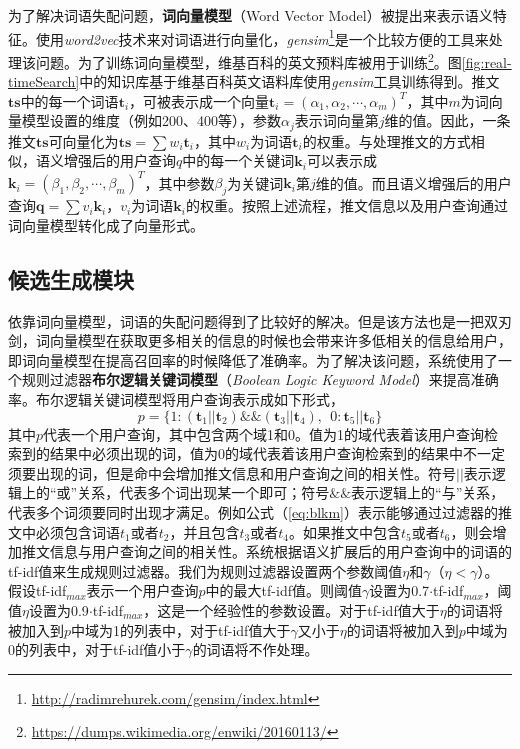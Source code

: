 为了解决词语失配问题，\textbf{词向量模型}（Word Vector Model）被提出来表示语义特征。使用\textit{word2vec}技术来对词语进行向量化，\textit{gensim}\footnote{\url{http://radimrehurek.com/gensim/index.html}}是一个比较方便的工具来处理该问题。为了训练词向量模型，维基百科的英文预料库被用于训练\footnote{\url{https://dumps.wikimedia.org/enwiki/20160113/}}。图\ref{fig:real-timeSearch}中的知识库基于维基百科英文语料库使用\textit{gensim}工具训练得到。推文$\mathbf{ts}$中的每一个词语$\mathbf{t}_i$，可被表示成一个向量$\mathbf{t}_i=\left(\alpha_1,\alpha_2,\cdots,\alpha_m\right)^T$，其中$m$为词向量模型设置的维度（例如200、400等），参数$\alpha_j$表示词向量第$j$维的值。因此，一条推文$\mathbf{ts}$可向量化为$\mathbf{ts}= \sum w_i \mathbf{t}_i$，其中$w_i$为词语$\mathbf{t}_i$的权重。与处理推文的方式相似，语义增强后的用户查询$q$中的每一个关键词$\mathbf{k}_i$可以表示成$\mathbf{k}_i = \left(\beta_1,\beta_2,\cdots,\beta_m\right)^T$，其中参数$\beta_j$为关键词$\mathbf{k}_i$第$j$维的值。而且语义增强后的用户查询$\mathbf{q} = \sum v_i \mathbf{k}_i$，$v_i$为词语$\mathbf{k}_i$的权重。按照上述流程，推文信息以及用户查询通过词向量模型转化成了向量形式。

\subsection{候选生成模块}
\label{subsec2:candidate}
依靠词向量模型，词语的失配问题得到了比较好的解决。但是该方法也是一把双刃剑，词向量模型在获取更多相关的信息的时候也会带来许多低相关的信息给用户，即词向量模型在提高召回率的时候降低了准确率。为了解决该问题，系统使用了一个规则过滤器\textbf{布尔逻辑关键词模型}（\textit{Boolean Logic Keyword Model}）来提高准确率。布尔逻辑关键词模型将用户查询表示成如下形式，
\begin{equation}
\label{eq:blkm}
  p = \{1:\left(\mathbf{t}_1 || \mathbf{t}_2\right) \& \& \left(\mathbf{t}_3 || \mathbf{t}_4\right),~~0:\mathbf{t}_5 || \mathbf{t}_6\}
\end{equation}
其中$p$代表一个用户查询，其中包含两个域1和0。值为1的域代表着该用户查询检索到的结果中必须出现的词，值为0的域代表着该用户查询检索到的结果中不一定须要出现的词，但是命中会增加推文信息和用户查询之间的相关性。符号$||$表示逻辑上的“或”关系，代表多个词出现某一个即可；符号$\&\&$表示逻辑上的“与”关系，代表多个词须要同时出现才满足。例如公式（\ref{eq:blkm}）表示能够通过过滤器的推文中必须包含词语$t_1$或者$t_2$，并且包含$t_3$或者$t_4$。如果推文中包含$t_5$或者$t_6$，则会增加推文信息与用户查询之间的相关性。系统根据语义扩展后的用户查询中的词语的tf-idf值来生成规则过滤器。我们为规则过滤器设置两个参数阈值$\eta$和$\gamma$（$\eta < \gamma$）。假设tf-idf$_{max}$表示一个用户查询$p$中的最大tf-idf值。则阈值$\gamma$设置为0.7$\cdot$tf-idf$_{max}$，阈值$\eta$设置为0.9$\cdot$tf-idf$_{max}$，这是一个经验性的参数设置。对于tf-idf值大于$\eta$的词语将被加入到$p$中域为1的列表中，对于tf-idf值大于$\gamma$又小于$\eta$的词语将被加入到$p$中域为0的列表中，对于tf-idf值小于$\gamma$的词语将不作处理。

